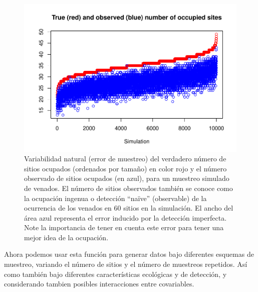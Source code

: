 \documentclass[]{book}
\begin{document}
\begin{figure}[htbp]
\centering
\includegraphics{Simul-Machalilla-book_files/figure-latex/funcall2-1.pdf}
\caption{\label{fig:funcall2}Variabilidad natural (error de muestreo) del
verdadero número de sitios ocupados (ordenados por tamaño) en color rojo
y el número observado de sitios ocupados (en azul), para un muestreo
simulado de venados. El número de sitios observados también se conoce
como la ocupación ingenua o detección ``naïve'' (observable) de la
ocurrencia de los venados en 60 sitios en la simulación. El ancho del
área azul representa el error inducido por la detección imperfecta. Note
la importancia de tener en cuenta este error para tener una mejor idea
de la ocupación.}
\end{figure}

Ahora podemos usar esta función para generar datos bajo diferentes
esquemas de muestreo, variando el número de sitios y el número de
muestreos repetidos. Así como también bajo diferentes características
ecológicas y de detección, y considerando tambien posibles interacciones
entre covariables.
\end{document}
